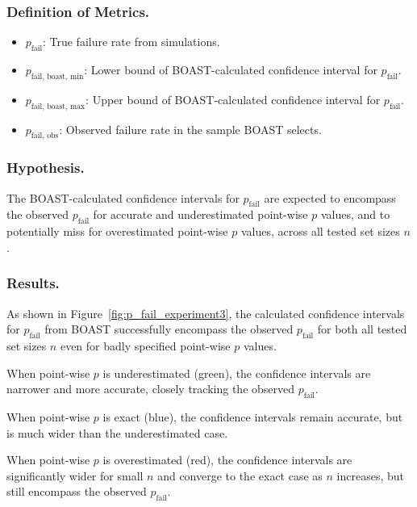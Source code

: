     \subsubsection{Definition of Metrics.}

    \begin{itemize}
        \item $p_\text{fail}$: True failure rate from simulations.  
        \item $p_\text{fail, boast, min}$: Lower bound of BOAST-calculated confidence interval for $p_\text{fail}$.  
        \item $p_\text{fail, boast, max}$: Upper bound of BOAST-calculated confidence interval for $p_\text{fail}$.
        \item $p_\text{fail, obs}$: Observed failure rate in the sample BOAST selects.  
    \end{itemize}

    \subsubsection{Hypothesis.}

        The BOAST-calculated confidence intervals for $p_\text{fail}$ are expected to encompass the observed $p_\text{fail}$ for accurate and underestimated point-wise $p$ values, and to potentially miss for overestimated point-wise $p$ values, across all tested set sizes $n$.

    \subsubsection{Results.}

        As shown in Figure~\ref{fig:p_fail_experiment3}, the calculated confidence intervals for $p_\text{fail}$ from BOAST successfully encompass the observed $p_\text{fail}$ for both all tested set sizes $n$ even for badly specified point-wise $p$ values.

        When point-wise $p$ is underestimated (green), the confidence intervals are narrower and more accurate, closely tracking the observed $p_\text{fail}$.

        When point-wise $p$ is exact (blue), the confidence intervals remain accurate, but is much wider than the underestimated case.

        When point-wise $p$ is overestimated (red), the confidence intervals are significantly wider for small $n$ and converge to the exact case as $n$ increases, but still encompass the observed $p_\text{fail}$.

